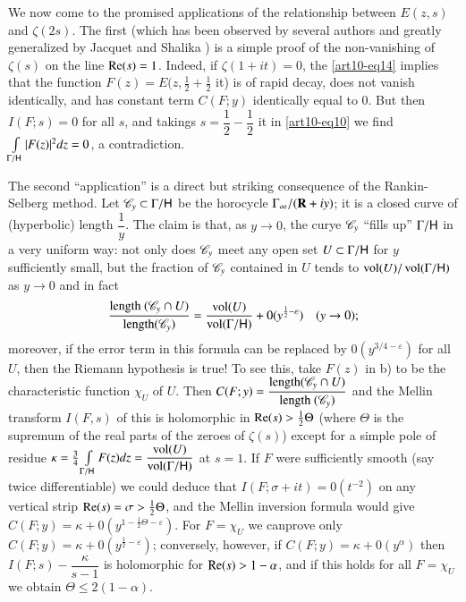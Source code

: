 We now come to the promised applications of the relationship between $E (z,s)$ and $\zeta(2s)$. The first (which has been observed by several authors and greatly generalized by Jacquet and Shalika \cite{art10-3}) is a simple proof of the non-vanishing of $\zeta(s)$ on the line $\operatorname{Re} (s) =1$. Indeed, if $\zeta (1+it) = 0$, the \eqref{art10-eq14} implies that the function $F(z) = E (z, \frac{1}{2} + \frac{1}{2}$ it) is of rapid decay, does not vanish identically, and has constant term $C(F;y)$ identically equal to 0. But then $I(F;s) =0$ for all $s$, and takings $s = \dfrac{1}{2} - \dfrac{1}{2}$ it in \eqref{art10-eq10} we find $\int\limits_{\Gamma / \mathsf{H}} |F(z)|^2 d z = 0$, a contradiction.

The second ``application'' is a direct but striking consequence of the Rankin-Selberg method. Let $\mathscr{C}_y \subset \Gamma / \mathsf{H}$ be the horocycle $\Gamma_\infty/ (\mathbf{R}+ iy)$; it is a closed curve of (hyperbolic) length $\dfrac{1}{y}$. The claim is that, as $y \to 0$, the curye $\mathscr{C}_y$ ``fills up'' $\Gamma / \mathsf{H}$ in a very uniform way: not only does $\mathscr{C}_y$ meet any open set $U \subset \Gamma / \mathsf{H}$ for $y$ sufficiently small, but the fraction of $\mathscr{C}_y$ contained in $U$ tends to $\operatorname{vol} (U)/ \operatorname{vol} (\Gamma / \mathsf{H})$ as $y \to 0$ and in fact
$$
\frac{\text{length }(\mathscr{C}_y \cap U)}{\text{length} (\mathscr{C}_y)} = \frac{\operatorname{vol} (U)}{\operatorname{vol} (\Gamma/ \mathsf{H})} + 0 (y^{\frac{1}{2} - \varepsilon}) \quad (y \to 0);
$$
moreover, if the error term in this formula can be replaced by $0(y^{3/4 - \varepsilon})$ for all $U$, then the Riemann hypothesis is true! To see this, take $F (z)$ in b) to be the characteristic function $\chi_U$ of $U$. Then $C (F; y) = \dfrac{\text{length} (\mathscr{C}_y \cap U)}{\text{length } (\mathscr{C}_y)}$ and the Mellin transform $I (F, s)$ of this is holomorphic in $\operatorname{Re} (s) > \frac{1}{2} \Theta$ (where $\Theta$ is the supremum of the real parts of the zeroes of $\zeta (s)$) except for a simple pole of residue $\kappa = \frac{3}{4} \int\limits_{\Gamma / \mathsf{H}} F (z) d z = \dfrac{\operatorname{vol} (U)}{\operatorname{vol} (\Gamma / \mathsf{H})}$ at $s =1$. If $F$ were sufficiently smooth (say twice differentiable) we could deduce that $I(F; \sigma + it) = 0 (t^{-2})$ on any vertical strip $\operatorname{Re}(s) = \sigma > \frac{1}{2} \Theta$, and the Mellin inversion formula would give $C (F; y) = \kappa + 0 (y^{1-\frac{1}{2} \Theta -\varepsilon})$. For $F = \chi_U$ we can\pageoriginale prove only $C (F; y) = \kappa + 0 (y^{\frac{1}{2} - \varepsilon})$; conversely, however, if $C (F; y) = \kappa + 0(y^\alpha)$ then $I (F; s) - \dfrac{\kappa}{s-1}$ is holomorphic for $\operatorname{Re}(s) >1-\alpha$, and if this holds for all $F = \chi_U$ we obtain $\Theta \leqslant 2 (1-\alpha)$.

